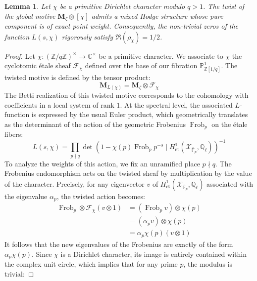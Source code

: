 \documentclass[
]{article}
\newtheorem{lemma}{Lemma}
\begin{document}
\begin{lemma}
Let $\chi$ be a primitive Dirichlet character modulo $q > 1$. The twist of the global motive $\mathbf{M}_{\zeta} \otimes [\chi]$ admits a mixed Hodge structure whose pure component is of exact point weight. Consequently, the non-trivial zeros of the function $L(s, \chi)$ rigorously satisfy $\Re(\rho_{\chi}) = 1/2$.
\end{lemma}

\begin{proof}
Let $\chi : (\mathbb{Z}/q\mathbb{Z})^{\times} \to \mathbb{C}^{\times}$ be a primitive character. We associate to $\chi$ the cyclotomic étale sheaf $\mathcal{F}_{\chi}$ defined over the base of our fibration $\mathbb{P}^1_{\mathbb{Z}[1/q]}$. The twisted motive is defined by the tensor product:
\begin{equation*}
\mathbf{M}_{L(\chi)} = \mathbf{M}_{\zeta} \otimes \mathcal{F}_{\chi}
\end{equation*}
The Betti realization of this twisted motive corresponds to the cohomology with coefficients in a local system of rank $1$. At the spectral level, the associated $L$-function is expressed by the usual Euler product, which geometrically translates as the determinant of the action of the geometric Frobenius $\operatorname{Frob}_p$ on the étale fibers:
\begin{equation*}
L(s, \chi) = \prod_{p \nmid q} \det\left(1 - \chi(p) \operatorname{Frob}_p p^{-s} \mid H^1_{\text{et}}(\mathcal{X}_{\bar{\mathbb{F}}_p}, \mathbb{Q}_{\ell}) \right)^{-1}
\end{equation*}
To analyze the weights of this action, we fix an unramified place $p \nmid q$. The Frobenius endomorphism acts on the twisted sheaf by multiplication by the value of the character. Precisely, for any eigenvector $v$ of $H^1_{\text{et}}(\mathcal{X}_{\bar{\mathbb{F}}_p}, \mathbb{Q}_{\ell})$ associated with the eigenvalue $\alpha_p$, the twisted action becomes:
\begin{align*}
\operatorname{Frob}_p \otimes \mathcal{F}_{\chi} (v \otimes 1) &= (\operatorname{Frob}_p v) \otimes \chi(p) \\
&= (\alpha_p v) \otimes \chi(p) \\
&= \alpha_p \chi(p) (v \otimes 1)
\end{align*}
It follows that the new eigenvalues of the Frobenius are exactly of the form $\alpha_p \chi(p)$. Since $\chi$ is a Dirichlet character, its image is entirely contained within the complex unit circle, which implies that for any prime $p$, the modulus is trivial:

\end{proof}
\end{document}
